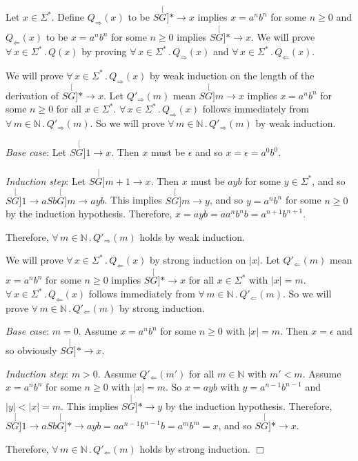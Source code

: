 \documentclass[11pt,fleqn]{article}
\newcommand{\ForallApp}{\forall\,}
\newcommand{\mdot}{\mathrel.}
\newcommand{\der}[2]{\stackrel[#2]{#1}{\longrightarrow}}
\newcommand{\sglsp}{\ }
\newenvironment{proof}{\par\noindent{\bf Proof\sglsp}}{\hfill$\Box$}
\begin{document}
\begin{proof} Let $x \in \Sigma^*$.  
  Define $Q_{\Rightarrow}(x)$ to be $S \der{*}{G} x$ implies $x =
  a^nb^n$ for some $n \ge 0$ and $Q_{\Leftarrow}(x)$ to be $x =
  a^nb^n$ for some $n \ge 0$ implies $S \der{*}{G} x$.  We will prove
  $\ForallApp x \in \Sigma^* \mdot Q(x)$ by proving $\ForallApp x \in
  \Sigma^* \mdot Q_{\Rightarrow}(x)$ and $\ForallApp x \in \Sigma^*
  \mdot Q_{\Leftarrow}(x)$.

\bigskip

We will prove $\ForallApp x \in \Sigma^* \mdot Q_{\Rightarrow}(x)$ by
weak induction on the length of the derivation of $S \der{*}{G} x$.
Let $Q'_{\Rightarrow}(m)$ mean $S \der{m}{G} x$ implies $x = a^nb^n$
for some $n \ge 0$ for all $x \in \Sigma^*$.  $\ForallApp x \in
\Sigma^* \mdot Q_{\Rightarrow}(x)$ follows immediately from
$\ForallApp m \in \mathbb{N} \mdot Q'_{\Rightarrow}(m)$.  So we will
prove $\ForallApp m \in \mathbb{N} \mdot Q'_{\Rightarrow}(m)$ by weak
induction.

\emph{Base case}: Let $S \der{1}{G} x$.  Then $x$ must be $\epsilon$
and so $x = \epsilon = a^0b^0$.

\emph{Induction step}: Let $S \der{m+1}{G} x$.  Then $x$ must be $ayb$
for some $y \in \Sigma^*$, and so $S \der{1}{G} aSb \der{m}{G} ayb$.
This implies $S \der{m}{G} y$, and so $y = a^nb^n$ for some $n \ge 0$
by the induction hypothesis.  Therefore, $x = ayb = aa^nb^nb =
a^{n+1}b^{n+1}$. 

Therefore, $\ForallApp m \in \mathbb{N} \mdot Q'_{\Rightarrow}(m)$
holds by weak induction.

\bigskip

We will prove $\ForallApp x \in \Sigma^* \mdot Q_{\Leftarrow}(x)$ by
strong induction on $|x|$.  Let $Q'_{\Leftarrow}(m)$ mean $x = a^nb^n$
for some $n \ge 0$ implies $S \der{*}{G} x$ for
all $x \in \Sigma^*$ with $|x| = m$.  $\ForallApp x \in \Sigma^* \mdot
Q_{\Leftarrow}(x)$ follows immediately from $\ForallApp m \in
\mathbb{N} \mdot Q'_{\Leftarrow}(m)$.  So we will prove $\ForallApp m
\in \mathbb{N} \mdot Q'_{\Leftarrow}(m)$ by strong induction.

\emph{Base case}: $m = 0$. Assume $x = a^nb^n$ for some $n \ge 0$ with
$|x| = m$.  Then $x = \epsilon$ and so obviously $S \der{*}{G} x$.

\emph{Induction step}: $m > 0$. Assume $Q'_{\Leftarrow}(m')$ for all
$m \in \mathbb{N}$ with $m' < m$.  Assume $x = a^nb^n$ for some $n \ge
0$ with $|x| = m$.  So $x = ayb$ with $y = a^{n-1}b^{n-1}$ and $|y| <
|x| = m$.  This implies $S \der{*}{G} y$ by the induction hypothesis.
Therefore, $S \der{1}{G} aSb \der{*}{G} ayb = aa^{n-1}b^{n-1}b =
a^mb^m = x$, and so $S \der{*}{G} x$.

Therefore, $\ForallApp m \in \mathbb{N} \mdot Q'_{\Leftarrow}(m)$
holds by strong induction.
\end{proof}
\end{document}
